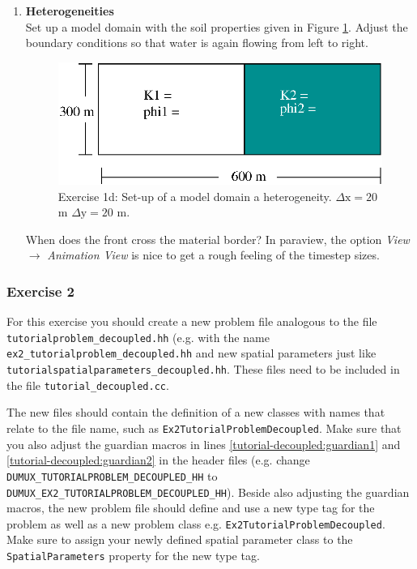 \begin{enumerate}
\item \textbf{Heterogeneities}  \\
Set up a model domain with the soil properties given in Figure \ref{tutorial-deoucpled:exercise1_d}. Adjust the boundary conditions so that water is again flowing from left to right.
\begin{figure}[ht]
\centering
\includegraphics[width=0.5\linewidth,keepaspectratio]{EPS/exercise1_c.eps}
\caption{Exercise 1d: Set-up of a model domain a heterogeneity. $\Delta \text{x} = 20$ m $\Delta \text{y} = 20$ m.}\label{tutorial-deoucpled:exercise1_d}
\end{figure}
When does the front cross the material border? In paraview, the option \textit{View} $\rightarrow$ \textit{Animation View} is nice to get a rough feeling of the timestep sizes.
\end{enumerate}

\subsubsection{Exercise 2}
For this exercise you should create a new problem file analogous to
the file \texttt{tutorialproblem\_decoupled.hh} (e.g. with the name 
\texttt{ex2\_tutorialproblem\_decoupled.hh} and new spatial parameters 
just like \texttt{tutorialspatialparameters\_decoupled.hh}. These files need to
be included in the file \texttt{tutorial\_decoupled.cc}. 

The new files should contain the definition of a new classes with 
names that relate to the file name, such as \texttt{Ex2TutorialProblemDecoupled}. 
Make sure that you also adjust the guardian
macros in lines \ref{tutorial-decoupled:guardian1} and \ref{tutorial-decoupled:guardian2}
 in the header files (e.g. change \\
\texttt{DUMUX\_TUTORIALPROBLEM\_DECOUPLED\_HH} to
\texttt{DUMUX\_EX2\_TUTORIALPROBLEM\_DECOUPLED\_HH}).  Beside also adjusting the guardian macros, 
the new problem file should define and use a new type tag for the problem as well as a new problem class
e.g. \texttt{Ex2TutorialProblemDecoupled}. Make sure to assign your newly defined spatial 
parameter class to the \texttt{SpatialParameters} property for the new 
type tag. 

